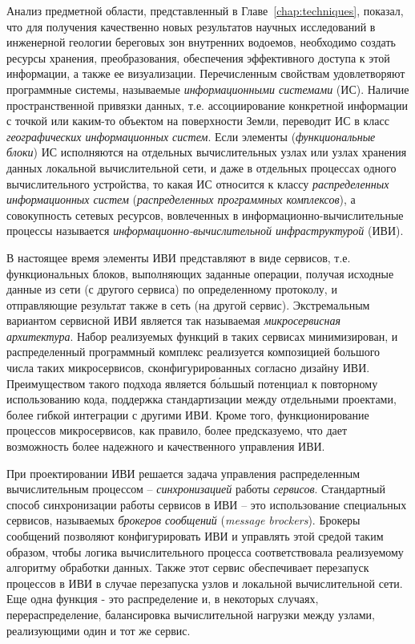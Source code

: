 \documentclass[732,14pt,final]{studrep}
\begin{document}
Анализ предметной области, представленный в Главе~\ref{chap:techniques}, показал, что для получения качественно новых результатов научных исследований в инженерной геологии береговых зон внутренних водоемов, необходимо создать ресурсы хранения, преобразования, обеспечения эффективного доступа к этой информации, а также ее визуализации. Перечисленным свойствам удовлетворяют программные системы, называемые \emph{информационными системами} (ИС). Наличие пространственной привязки данных, т.е. ассоциирование конкретной информации с точкой или каким-то объектом на поверхности Земли, переводит ИС в класс \emph{географических информационных систем}. Если элементы (\emph{функциональные блоки}) ИС исполняются на отдельных вычислительных узлах или узлах хранения данных локальной вычислительной сети, и даже в отдельных процессах одного вычислительного устройства, то какая ИС относится к классу \emph{распределенных информационных систем} (\emph{распределенных программных комплексов}), а совокупность сетевых ресурсов, вовлеченных в информационно-вычислительные процессы называется \emph{информационно-вычислительной инфраструктурой} (ИВИ).

В настоящее время элементы ИВИ представляют в виде сервисов, т.е. функциональных блоков, выполняющих заданные операции, получая исходные данные из сети (с другого сервиса) по определенному протоколу, и отправляющие результат также в сеть (на другой сервис). Экстремальным вариантом сервисной ИВИ является так называемая \emph{микросервисная архитектура}. Набор реализуемых функций в таких сервисах минимизирован, и распределенный программный комплекс реализуется композицией большого числа таких микросервисов, сконфигурированных согласно дизайну ИВИ. Преимуществом такого подхода является б\'ольшый потенциал к повторному использованию кода, поддержка стандартизации между отдельными проектами, более гибкой интеграции с другими ИВИ. Кроме того, функционирование процессов микросервисов, как правило, более предсказуемо, что дает возможность более надежного и качественного управления ИВИ.

При проектировании ИВИ решается задача управления распределенным вычислительным процессом -- \emph{синхронизацией} работы \emph{сервисов}. Стандартный способ синхронизации работы сервисов в ИВИ -- это использование специальных сервисов, называемых \emph{брокеров сообщений} (\emph{message brockers}). Брокеры сообщений позволяют конфигурировать ИВИ и управлять этой средой таким образом, чтобы логика вычислительного процесса соответствовала реализуемому алгоритму обработки данных. Также этот сервис обеспечивает перезапуск процессов в ИВИ в случае перезапуска узлов и локальной вычислительной сети. Еще одна функция - это распределение и, в некоторых случаях, перераспределение, балансировка вычислительной нагрузки между узлами, реализующими один и тот же сервис.
\end{document}
